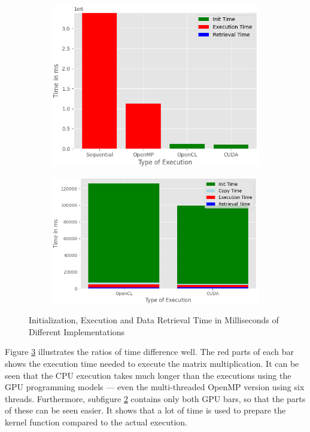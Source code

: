 \begin{figure}[htbp]
  \begin{center}
  \begin{subfigure}{0.48\textwidth}
    \includegraphics[width=\linewidth]{figures/results.png}
    \caption{ }
	\label{subfig:a}
  \end{subfigure}    
  \begin{subfigure}{0.48\textwidth}
    \includegraphics[width=\linewidth]{figures/GPUs_Time.png}
    \caption{ }
	\label{subfig:b}
  \end{subfigure}
    \caption{Initialization, Execution and Data Retrieval Time in Milliseconds of Different Implementations}
    \label{fig:time}
  \end{center}
\end{figure}

Figure \ref{fig:time} illustrates the ratios of time difference well.
The red parts of each bar shows the execution time needed to execute the matrix multiplication.
It can be seen that the CPU execution takes much longer than the executions using the GPU programming models --- even the multi-threaded OpenMP version using six threads.
Furthermore, subfigure \ref{subfig:b} contains only both GPU bars, so that the parts of these can be seen easier.
It shows that a lot of time is used to prepare the kernel function compared to the actual execution.


